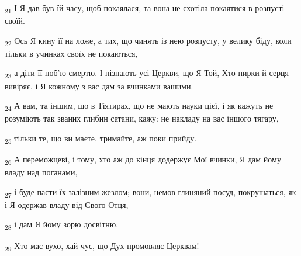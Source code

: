 \begin{tcolorbox}
\textsubscript{21} І Я дав був їй часу, щоб покаялася, та вона не схотіла покаятися в розпусті своїй.
\end{tcolorbox}
\begin{tcolorbox}
\textsubscript{22} Ось Я кину її на ложе, а тих, що чинять із нею розпусту, у велику біду, коли тільки в учинках своїх не покаються,
\end{tcolorbox}
\begin{tcolorbox}
\textsubscript{23} а діти її поб'ю смертю. І пізнають усі Церкви, що Я Той, Хто нирки й серця вивіряє, і Я кожному з вас дам за вчинками вашими.
\end{tcolorbox}
\begin{tcolorbox}
\textsubscript{24} А вам, та іншим, що в Тіятирах, що не мають науки цієї, і як кажуть не розуміють так званих глибин сатани, кажу: не накладу на вас іншого тягару,
\end{tcolorbox}
\begin{tcolorbox}
\textsubscript{25} тільки те, що ви маєте, тримайте, аж поки прийду.
\end{tcolorbox}
\begin{tcolorbox}
\textsubscript{26} А переможцеві, і тому, хто аж до кінця додержує Мої вчинки, Я дам йому владу над поганами,
\end{tcolorbox}
\begin{tcolorbox}
\textsubscript{27} і буде пасти їх залізним жезлом; вони, немов глиняний посуд, покрушаться, як і Я одержав владу від Свого Отця,
\end{tcolorbox}
\begin{tcolorbox}
\textsubscript{28} і дам Я йому зорю досвітню.
\end{tcolorbox}
\begin{tcolorbox}
\textsubscript{29} Хто має вухо, хай чує, що Дух промовляє Церквам!
\end{tcolorbox}
